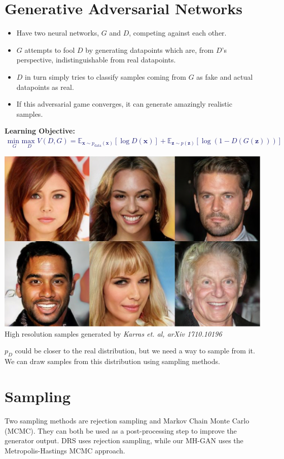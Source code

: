 \documentclass[a0,landscape]{a0poster}
\newcommand{\mbf}[1]{{\boldsymbol{\mathbf{#1}}}}
\renewcommand{\bm}{\mbf}
\begin{document}
\begin{multicols}{3}
\section*{\fontsize{67.1}{82} \selectfont \color{NavyBlue} Generative Adversarial Networks \color{Black}}
\setlength{}  
\setlength\leftmargini{\dimexpr\leftmargini + 0.5em\relax}
\vspace{-.5in}
\begin{itemize}
\item Have two neural networks, $G$ and $D$, competing against each other. 
\item $G$ attempts to fool $D$ by generating datapoints which are, from $D$'s perspective, indistinguishable from real datapoints.
\item $D$ in turn simply tries to classify samples coming from $G$ as fake and actual datapoints as real.
\item If this adversarial game converges, it can generate amazingly realistic samples.
\end{itemize}
\textbf{Learning Objective:}
\textcolor{MidnightBlue}{
  \begin{align}
    \underset{G}{\text{min }}\underset{D} {\text{max }} V(D,G) = \mathbb{E}_{\bm{x} \sim p_{\text{data}}(\bm{x})} [\log D(\bm{x})]
    + \mathbb{E}_{\bm{z} \sim p(\bm{z})} [\log(1-D(G(\bm{z})))] \nonumber
  \end{align}}
\begin{centering}
\includegraphics[width=.1\textwidth]{goodsamples.pdf} \\
\small High resolution samples generated by \emph{Karras et. al, arXiv 1710.10196} \\
\end{centering}
\vspace{-.8in}

$p_D$ could be closer to the real distribution, but we need a way to sample from it. We can draw samples from this distribution using sampling methods.

\section*{\fontsize{67.1}{82} \selectfont \color{NavyBlue} Sampling \color{Black}}
Two sampling methods are rejection sampling and Markov Chain Monte Carlo (MCMC). They can both be used as a post-processing step to improve the generator output. DRS uses rejection sampling, while our MH-GAN uses the Metropolis-Hastings MCMC approach.


\end{multicols}
\end{document}
